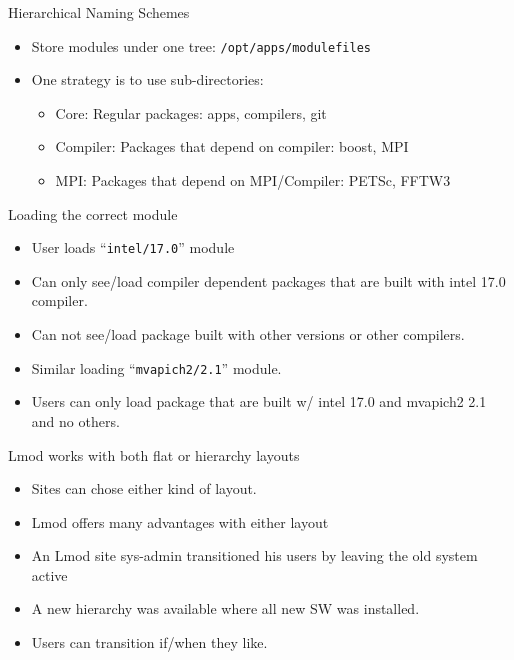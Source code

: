 \documentclass{beamer}
\begin{document}
\begin{frame}{Hierarchical Naming Schemes}
  \begin{itemize}
    \item Store modules under one tree: \texttt{/opt/apps/modulefiles}
    \item One strategy is to use sub-directories:
      \begin{itemize}
        \item Core: Regular packages: apps, compilers, git
        \item Compiler: Packages that depend on compiler: boost, MPI
        \item MPI: Packages that depend on MPI/Compiler: PETSc, FFTW3
      \end{itemize}
  \end{itemize}
\end{frame}

\begin{frame}{Loading the correct module}
  \begin{itemize}
    \item User loads ``\texttt{intel/17.0}'' module
    \item Can only see/load compiler dependent packages that are built with
      intel 17.0 compiler.
    \item Can not see/load package built with other versions or other compilers.
    \item Similar loading ``\texttt{mvapich2/2.1}'' module.
    \item Users can only load package that are built w/ intel 17.0 and
      mvapich2 2.1 and no others.
  \end{itemize}
\end{frame}

\begin{frame}{Lmod works with both flat or hierarchy layouts}
  \begin{itemize}
    \item Sites can chose either kind of layout.  
    \item Lmod offers many advantages with either layout
    \item An Lmod site sys-admin transitioned his users by leaving the
      old system active
    \item A new hierarchy was available where all new SW was installed.
    \item Users can transition if/when they like.
  \end{itemize}
\end{frame}
\end{document}
